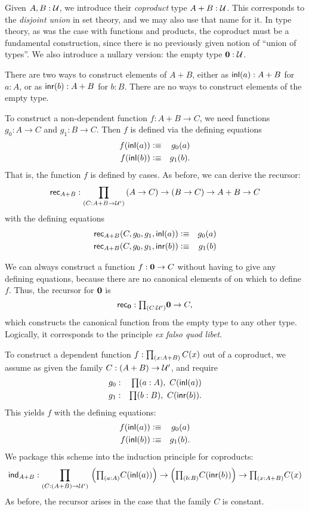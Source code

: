 Given $A,B:\mathcal{U}$, we introduce their \emph{coproduct} type $A+B:\mathcal{U}$.
This corresponds to the \emph{disjoint union} in set theory, and we may also use that name for it.
In type theory, as was the case with functions and products, the coproduct must be a fundamental construction, since there is no previously given notion of ``union of types''.
We also introduce a
nullary version: the empty type $\mathbf{0}:\mathcal{U}$.

There are two ways to construct elements of $A+B$, either as ${\mathsf{inl}}(a) : A+B$ for $a:A$, or as
${\mathsf{inr}}(b):A+B$ for $b:B$. There are no ways to construct elements of the empty type. 

To construct a non-dependent function $f : A+B \to C$, we need 
functions $g_0 : A \to C$ and $g_1 : B \to C$. Then $f$ is defined
via the defining equations
\begin{eqnarray*}
  f({\mathsf{inl}}(a)) & \vcentcolon\equiv & g_0(a) \\
  f({\mathsf{inl}}(b)) & \vcentcolon\equiv & g_1(b).
\end{eqnarray*}
That is, the function $f$ is defined by cases. As before, we can
derive the recursor:
\[ \rec{A+B} : \dprd{C:A+B \to \UU'}(A \to C) \to (B\to C) \to A+B \to C\]
with the defining equations
\begin{eqnarray*}
\mathsf{rec}_{A+B}(C,g_0,g_1,{\mathsf{inl}}(a)) & \vcentcolon\equiv & g_0(a) \\
\mathsf{rec}_{A+B}(C,g_0,g_1,{\mathsf{inr}}(b)) & \vcentcolon\equiv & g_1(b)
\end{eqnarray*}

We can always construct a function $f : \mathbf{0} \to C$ without
having to give any defining equations, because there are no canonical elements of \emptyt on which to define $f$.
Thus, the recursor for $\mathbf{0}$ is
\[\rec{\emptyt} : \tprd{C:\UU'} \emptyt \to C,\]
which constructs the canonical function from the empty type to any other type.
Logically, it corresponds to the principle \emph{ex falso quod libet}. 

To construct a dependent function $f:\prd{x:A+B}C(x)$ out of a coproduct, we assume as given the family 
$C: (A + B) \to \mathcal{U}'$, and 
require 
\begin{eqnarray*}
  g_0 & : & \prd{a:A} C(\inl(a)) \\
  g_1 & : & \prd{b:B} C(\inr(b)).
\end{eqnarray*}
This yields $f$ with the defining equations:
\begin{eqnarray*}
  f({\mathsf{inl}}(a)) & \vcentcolon\equiv & g_0(a) \\
  f({\mathsf{inl}}(b)) & \vcentcolon\equiv & g_1(b) .
\end{eqnarray*}
We package this scheme into the induction principle for coproducts:
\begin{align*}
  \ind{A+B} :  \dprd{C: (A + B) \to \UU'}
  \Big(\tprd{a:A} C(\inl(a))\Big) \to \Big(\tprd{b:B} C(\inr(b))\Big)
  \to \tprd{x:A+B}C(x) 
\end{align*}
As before, the recursor arises in the case that the family $C$ is
constant. 

